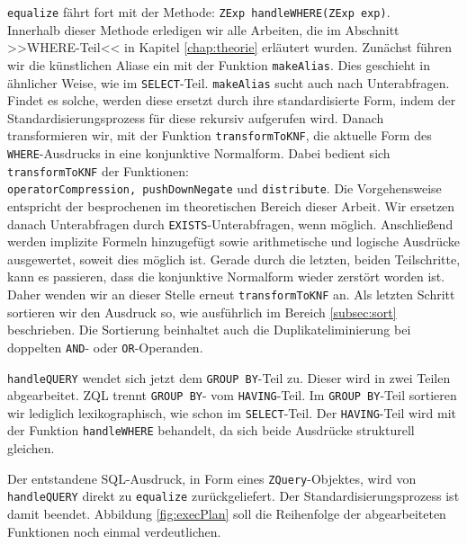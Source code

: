 \verb|equalize| fährt fort mit der Methode: \verb|ZExp handleWHERE(ZExp exp)|.\\
Innerhalb dieser Methode erledigen wir alle Arbeiten, die im Abschnitt >>WHERE-Teil<< in Kapitel \ref{chap:theorie} erläutert wurden. Zunächst führen wir die künstlichen Aliase ein mit der Funktion \verb|makeAlias|. Dies geschieht in ähnlicher Weise, wie im \verb|SELECT|-Teil. \verb|makeAlias| sucht auch nach Unterabfragen. Findet es solche, werden diese ersetzt durch ihre standardisierte Form, indem der Standardisierungsprozess für diese rekursiv aufgerufen wird. Danach transformieren wir, mit der Funktion \verb|transformToKNF|, die aktuelle Form des \verb|WHERE|-Ausdrucks in eine konjunktive Normalform. Dabei bedient sich \verb|transformToKNF| der Funktionen:\\
\verb|operatorCompression, pushDownNegate| und \verb|distribute|. Die Vorgehensweise entspricht der besprochenen im theoretischen Bereich dieser Arbeit. Wir ersetzen danach Unterabfragen durch \verb|EXISTS|-Unterabfragen, wenn möglich. Anschließend werden implizite Formeln hinzugefügt sowie arithmetische und logische Ausdrücke ausgewertet, soweit dies möglich ist. Gerade durch die letzten, beiden Teilschritte, kann es passieren, dass die konjunktive Normalform wieder zerstört worden ist. Daher wenden wir an dieser Stelle erneut \verb|transformToKNF| an. Als letzten Schritt sortieren wir den Ausdruck so, wie ausführlich im Bereich \ref{subsec:sort} beschrieben. Die Sortierung beinhaltet auch die Duplikateliminierung bei doppelten \verb|AND|- oder \verb|OR|-Operanden.

\verb|handleQUERY| wendet sich jetzt dem \verb|GROUP BY|-Teil zu. Dieser wird in zwei Teilen abgearbeitet. ZQL trennt \verb|GROUP BY|- vom \verb|HAVING|-Teil. Im \verb|GROUP BY|-Teil sortieren wir lediglich lexikographisch, wie schon im \verb|SELECT|-Teil. Der \verb|HAVING|-Teil wird mit der Funktion \verb|handleWHERE| behandelt, da sich beide Ausdrücke strukturell gleichen.

Der entstandene SQL-Ausdruck, in Form eines \verb|ZQuery|-Objektes, wird von \verb|handleQUERY| direkt zu \verb|equalize| zurückgeliefert. Der Standardisierungsprozess ist damit beendet. Abbildung \ref{fig:execPlan} soll die Reihenfolge der abgearbeiteten Funktionen noch einmal verdeutlichen. 

